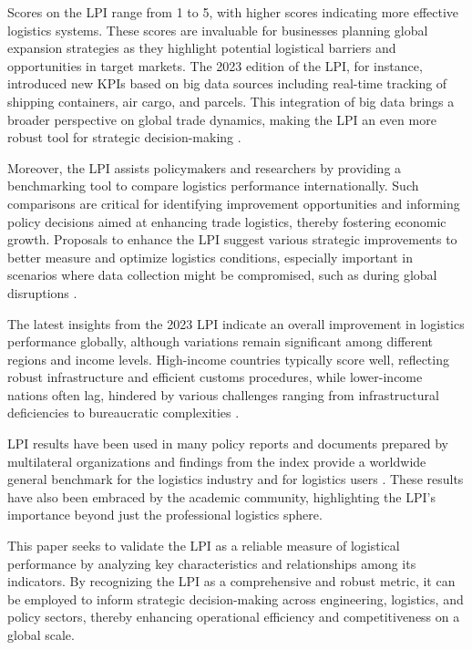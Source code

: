 \documentclass[sigconf]{acmart}
\begin{document}
Scores on the LPI range from 1 to 5, with higher scores indicating more effective logistics systems. These scores are invaluable for businesses planning global expansion strategies as they highlight potential logistical barriers and opportunities in target markets. The 2023 edition of the LPI, for instance, introduced new KPIs based on big data sources including real-time tracking of shipping containers, air cargo, and parcels. This integration of big data brings a broader perspective on global trade dynamics, making the LPI an even more robust tool for strategic decision-making \cite{arvis2023}.

Moreover, the LPI assists policymakers and researchers by providing a benchmarking tool to compare logistics performance internationally. Such comparisons are critical for identifying improvement opportunities and informing policy decisions aimed at enhancing trade logistics, thereby fostering economic growth. Proposals to enhance the LPI suggest various strategic improvements to better measure and optimize logistics conditions, especially important in scenarios where data collection might be compromised, such as during global disruptions \cite{rezaei2018, beysenbaev2020}.

The latest insights from the 2023 LPI indicate an overall improvement in logistics performance globally, although variations remain significant among different regions and income levels. High-income countries typically score well, reflecting robust infrastructure and efficient customs procedures, while lower-income nations often lag, hindered by various challenges ranging from infrastructural deficiencies to bureaucratic complexities \cite{arvis2023}.

LPI results have been used in many policy reports and documents prepared by multilateral organizations and findings from the index provide a worldwide general benchmark for the logistics industry and for logistics users \cite{WBreport2018}. These results have also been embraced by the academic community, highlighting the LPI's importance beyond just the professional logistics sphere.

This paper seeks to validate the LPI as a reliable measure of logistical performance by analyzing key characteristics and relationships among its indicators. By recognizing the LPI as a comprehensive and robust metric, it can be employed to inform strategic decision-making across engineering, logistics, and policy sectors, thereby enhancing operational efficiency and competitiveness on a global scale.
\end{document}
